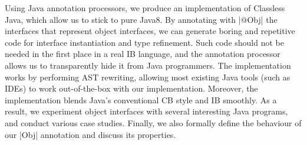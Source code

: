 






Using Java annotation processors, we produce an implementation of
Classless Java, which allow us to stick to pure Java8. By annotating
with \Q|@Obj| the interfaces that represent object interfaces, we can
generate boring and repetitive code for interface instantiation and
type refinement. Such code should not be needed in the first place in
a real IB language, and the annotation processor allows us to
transparently hide it from Java programmers.  The implementation works
by performing AST rewriting, allowing most existing Java tools (such as
IDEs) to work out-of-the-box with our implementation. Moreover, the
implementation blends Java's conventional CB style and IB smoothly.
As a result, we experiment object interfaces with several interesting
Java programs, and conduct various case studies.  Finally, we also
formally define the behaviour of our \Q|Obj| annotation and discuss
its properties.



%



